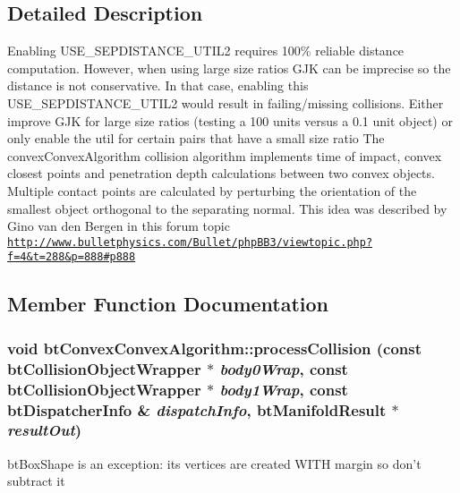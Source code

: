 \subsection{Detailed Description}
Enabling USE\_\-SEPDISTANCE\_\-UTIL2 requires 100\% reliable distance computation. However, when using large size ratios GJK can be imprecise so the distance is not conservative. In that case, enabling this USE\_\-SEPDISTANCE\_\-UTIL2 would result in failing/missing collisions. Either improve GJK for large size ratios (testing a 100 units versus a 0.1 unit object) or only enable the util for certain pairs that have a small size ratio The convexConvexAlgorithm collision algorithm implements time of impact, convex closest points and penetration depth calculations between two convex objects. Multiple contact points are calculated by perturbing the orientation of the smallest object orthogonal to the separating normal. This idea was described by Gino van den Bergen in this forum topic \href{http://www.bulletphysics.com/Bullet/phpBB3/viewtopic.php?f=4&t=288&p=888#p888}{\tt http://www.bulletphysics.com/Bullet/phpBB3/viewtopic.php?f=4\&t=288\&p=888\#p888} 

\subsection{Member Function Documentation}
\hypertarget{classbt_convex_convex_algorithm_b566631355a17f7a4bcbddf9454eb9e5}{
\subsubsection[processCollision]{\setlength{\rightskip}{0pt plus 5cm}void btConvexConvexAlgorithm::processCollision (const btCollisionObjectWrapper $\ast$ {\em body0Wrap}, \/  const btCollisionObjectWrapper $\ast$ {\em body1Wrap}, \/  const btDispatcherInfo \& {\em dispatchInfo}, \/  {\bf btManifoldResult} $\ast$ {\em resultOut})}}
\label{classbt_convex_convex_algorithm_b566631355a17f7a4bcbddf9454eb9e5}




btBoxShape is an exception: its vertices are created WITH margin so don't subtract it 

